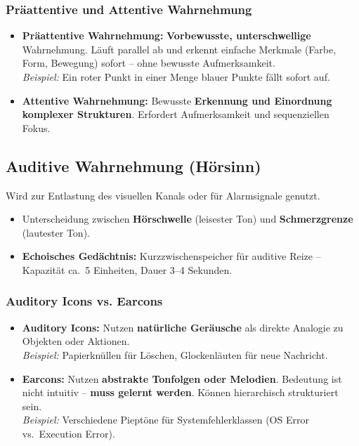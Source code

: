 \documentclass[12pt, a4paper]{article}
\begin{document}
\subsubsection{Präattentive und Attentive Wahrnehmung}

\begin{itemize}
  \item \textbf{Präattentive Wahrnehmung:} \textbf{Vorbewusste, unterschwellige}
        Wahrnehmung. Läuft parallel ab und erkennt einfache Merkmale (Farbe, Form,
        Bewegung) sofort -- ohne bewusste Aufmerksamkeit.\\
        \textit{Beispiel:} Ein roter Punkt in einer Menge blauer Punkte fällt sofort
        auf.
  \item \textbf{Attentive Wahrnehmung:} Bewusste \textbf{Erkennung und Einordnung
        komplexer Strukturen}. Erfordert Aufmerksamkeit und sequenziellen Fokus.
\end{itemize}

\subsection{Auditive Wahrnehmung (Hörsinn)}

Wird zur Entlastung des visuellen Kanals oder für Alarmsignale genutzt.

\begin{itemize}
  \item Unterscheidung zwischen \textbf{Hörschwelle} (leisester Ton) und
        \textbf{Schmerzgrenze} (lautester Ton).
  \item \textbf{Echoisches Gedächtnis:} Kurzzwischenspeicher für auditive Reize --
        Kapazität ca.\ 5 Einheiten, Dauer 3--4 Sekunden.
\end{itemize}

\subsubsection{Auditory Icons vs. Earcons}

\begin{itemize}
  \item \textbf{Auditory Icons:} Nutzen \textbf{natürliche Geräusche} als direkte
        Analogie zu Objekten oder Aktionen.\\
        \textit{Beispiel:} Papierknüllen für \glqq{}Löschen\grqq{}, Glockenläuten
        für neue Nachricht.
  \item \textbf{Earcons:} Nutzen \textbf{abstrakte Tonfolgen oder Melodien}. Bedeutung
        ist nicht intuitiv -- \textbf{muss gelernt werden}. Können hierarchisch
        strukturiert sein.\\
        \textit{Beispiel:} Verschiedene Pieptöne für Systemfehlerklassen
        (\glqq{}OS Error\grqq{} vs.\ \glqq{}Execution Error\grqq{}).
\end{itemize}
\end{document}
